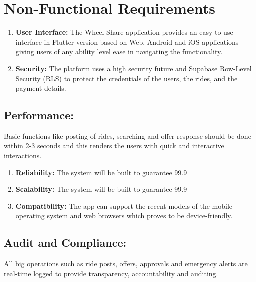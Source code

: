 \section{Non-Functional Requirements}

\begin{enumerate}[label=\roman*.]
    \item \textbf{User Interface:} The Wheel Share application provides an easy to use interface in Flutter version based on Web, Android and iOS applications giving users of any ability level ease in navigating the functionality. 
    
    \item \textbf{Security:} The platform uses a high security future and Supabase Row-Level Security (RLS) to protect the credentials of the users, the rides, and the payment details. 

\end{enumerate}

\subsection{Performance:} Basic functions like posting of rides, searching and offer response should be done within 2-3 seconds and this renders the users with quick and interactive interactions. 
\begin{enumerate}[label=\roman*.]
    \item \textbf{Reliability:} The system will be built to guarantee 99.9%
    \item \textbf{Scalability:} The system will be built to guarantee 99.9%
    \item \textbf{Compatibility:  } The app can support the recent models of the mobile operating system and web browsers which proves to be device-friendly.  
\end{enumerate}

\subsection{Audit and Compliance: }
\begin{enumerate}[label=\roman*.]
All big operations such as ride posts, offers, approvals and emergency alerts are real-time logged to provide transparency, accountability and auditing. 
\end{enumerate}





